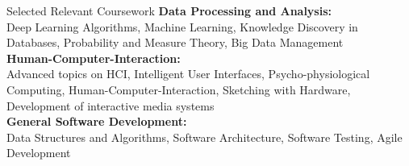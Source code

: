 \documentclass{resume} %
\begin{document}
\begin{rSection}{Selected Relevant Coursework} \itemsep -3pt
{\bf Data Processing and Analysis:}\\
Deep Learning Algorithms, Machine Learning, Knowledge Discovery in Databases, Probability and Measure Theory, Big Data Management\\

{\bf Human-Computer-Interaction:}\\
Advanced topics on HCI, Intelligent User Interfaces, Psycho-physiological Computing, Human-Computer-Interaction, Sketching with Hardware, Development of interactive media systems\\

{\bf General Software Development:}\\
Data Structures and Algorithms, Software Architecture, Software Testing, Agile Development

\end{rSection}
\end{document}
